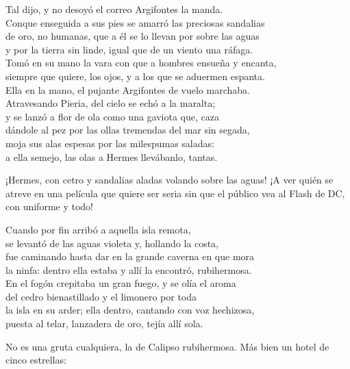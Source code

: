 \begin{versocita}
Tal dijo, y no desoyó el correo Argifontes la manda.\\
Conque enseguida a sus pies se amarró las preciosas sandalias\\
de oro, no humanas, que a él se lo llevan por sobre las aguas\\
y por la tierra sin linde, igual que de un viento una ráfaga.\\
Tomó en su mano la vara con que a hombres ensueña y encanta,\\
siempre que quiere, los ojos, y a los que se aduermen espanta.\\
Ella en la mano, el pujante Argifontes de vuelo marchaba.\\
Atravesando Pieria, del cielo se echó a la maralta;\\
y se lanzó a flor de ola como una gaviota que, caza\\
dándole al pez por las ollas tremendas del mar sin segada,\\
moja sus alas espesas por las milespumas saladas:\\
a ella semejo, las olas a Hermes llevábanlo, tantas.
\end{versocita}

¡Hermes, con cetro y sandalias aladas volando sobre las aguas! ¡A ver quién se atreve en una película que quiere ser seria sin que el público vea al Flash de DC, con uniforme y todo!

\begin{versocita}
Cuando por fin arribó a aquella isla remota,\\
se levantó de las aguas violeta y, hollando la costa,\\
fue caminando hasta dar en la grande caverna en que mora\\
la ninfa: dentro ella estaba y allí la encontró, rubihermosa.\\
En el fogón crepitaba un gran fuego, y se olía el aroma\\
del cedro bienastillado y el limonero por toda\\
la isla en su arder; ella dentro, cantando con voz hechizosa,\\
puesta al telar, lanzadera de oro, tejía allí sola.
\end{versocita}

No es una gruta cualquiera, la de Calipso rubihermosa. Más bien un hotel de cinco estrellas:

